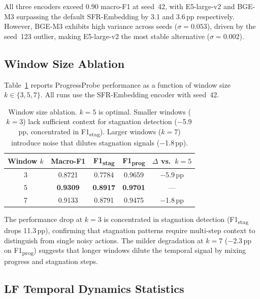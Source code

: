All three encoders exceed 0.90 macro-F1 at seed~42, with E5-large-v2 and BGE-M3 surpassing the default SFR-Embedding by 3.1 and 3.6\,pp respectively.
However, BGE-M3 exhibits high variance across seeds ($\sigma{=}0.053$), driven by the seed~123 outlier, making E5-large-v2 the most stable alternative ($\sigma{=}0.002$).

\subsection{Window Size Ablation}
\label{sec:app_window}

Table~\ref{tab:window_ablation} reports ProgressProbe performance as a function of window size $k \in \{3, 5, 7\}$.
All runs use the SFR-Embedding encoder with seed~42.

\begin{table}[h]
\centering
\small
\begin{tabular}{ccccc}
\toprule
\textbf{Window $k$} & \textbf{Macro-F1} & \textbf{F1\textsubscript{stag}} & \textbf{F1\textsubscript{prog}} & \textbf{$\Delta$ vs.\ $k{=}5$} \\
\midrule
3 & 0.8721 & 0.7784 & 0.9659 & $-$5.9\,pp \\
5 & \textbf{0.9309} & \textbf{0.8917} & \textbf{0.9701} & --- \\
7 & 0.9133 & 0.8791 & 0.9475 & $-$1.8\,pp \\
\bottomrule
\end{tabular}
\caption{Window size ablation. $k{=}5$ is optimal. Smaller windows ($k{=}3$) lack sufficient context for stagnation detection ($-$5.9\,pp, concentrated in F1\textsubscript{stag}). Larger windows ($k{=}7$) introduce noise that dilutes stagnation signals ($-$1.8\,pp).}
\label{tab:window_ablation}
\end{table}

The performance drop at $k{=}3$ is concentrated in stagnation detection (F1\textsubscript{stag} drops 11.3\,pp), confirming that stagnation patterns require multi-step context to distinguish from single noisy actions.
The milder degradation at $k{=}7$ ($-$2.3\,pp on F1\textsubscript{prog}) suggests that longer windows dilute the temporal signal by mixing progress and stagnation steps.

\subsection{LF Temporal Dynamics Statistics}
\label{sec:app_temporal}

